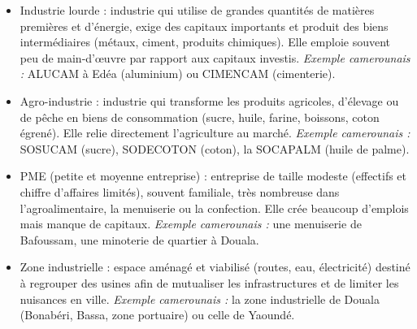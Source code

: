 \documentclass[11pt]{article}
\newcommand{\cle}[1]{{\popxbold\color{popdark}#1}}
\begin{document}
\begin{corrige}
\begin{itemize}
\item \cle{Industrie lourde} : industrie qui utilise de grandes quantités de matières premières et d'énergie, exige des capitaux importants et produit des biens intermédiaires (métaux, ciment, produits chimiques). Elle emploie souvent peu de main-d'œuvre par rapport aux capitaux investis. \emph{Exemple camerounais :} ALUCAM à Edéa (aluminium) ou CIMENCAM (cimenterie).
\item \cle{Agro-industrie} : industrie qui transforme les produits agricoles, d'élevage ou de pêche en biens de consommation (sucre, huile, farine, boissons, coton égrené). Elle relie directement l'agriculture au marché. \emph{Exemple camerounais :} SOSUCAM (sucre), SODECOTON (coton), la SOCAPALM (huile de palme).
\item \cle{PME} (petite et moyenne entreprise) : entreprise de taille modeste (effectifs et chiffre d'affaires limités), souvent familiale, très nombreuse dans l'agroalimentaire, la menuiserie ou la confection. Elle crée beaucoup d'emplois mais manque de capitaux. \emph{Exemple camerounais :} une menuiserie de Bafoussam, une minoterie de quartier à Douala.
\item \cle{Zone industrielle} : espace aménagé et viabilisé (routes, eau, électricité) destiné à regrouper des usines afin de mutualiser les infrastructures et de limiter les nuisances en ville. \emph{Exemple camerounais :} la zone industrielle de Douala (Bonabéri, Bassa, zone portuaire) ou celle de Yaoundé.
\end{itemize}
\end{corrige}
\end{document}
